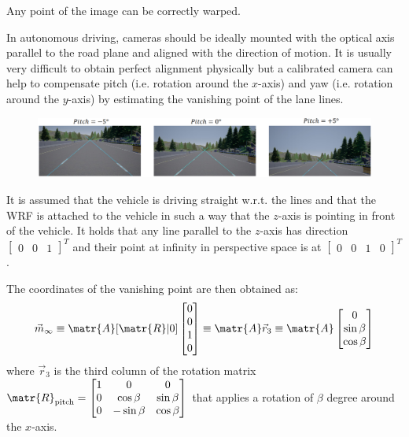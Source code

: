 \begin{descriptionlist}
        \begin{remark}
            Any point of the image can be correctly warped.
        \end{remark}

        \begin{example}
            In autonomous driving, cameras should be ideally mounted with the optical axis parallel to the road plane and aligned with the direction of motion.
            It is usually very difficult to obtain perfect alignment physically 
            but a calibrated camera can help to compensate pitch (i.e. rotation around the $x$-axis)
            and yaw (i.e. rotation around the $y$-axis) by estimating the vanishing point of the lane lines.

            \begin{figure}[H]
                \centering
                \includegraphics[width=0.85\linewidth]{./img/pitch_yaw_compensation.png}
            \end{figure}

            It is assumed that the vehicle is driving straight w.r.t. the lines and 
            that the WRF is attached to the vehicle in such a way that the $z$-axis is pointing in front of the vehicle.
            It holds that any line parallel to the $z$-axis has direction $\begin{bmatrix} 0 & 0 & 1 \end{bmatrix}^T$
            and their point at infinity in perspective space is at $\begin{bmatrix} 0 & 0 & 1 & 0 \end{bmatrix}^T$.

            The coordinates of the vanishing point are then obtained as:
            \[ 
                \vec{m}_\infty \equiv \matr{A}[\matr{R} | 0] \begin{bmatrix} 0 \\ 0 \\ 1 \\ 0 \end{bmatrix} 
                    \equiv \matr{A}\vec{r}_3 
                    \equiv \matr{A} \begin{bmatrix} 0 \\ \sin\beta \\ \cos\beta \end{bmatrix}
            \]
            where $\vec{r}_3$ is the third column of the rotation matrix $\matr{R}_\text{pitch} = \begin{bmatrix}
                1 & 0 & 0 \\ 0 & \cos\beta & \sin\beta \\ 0 & -\sin\beta & \cos\beta
            \end{bmatrix}$ that applies a rotation of $\beta$ degree around the $x$-axis.


\end{example}
\end{descriptionlist}
